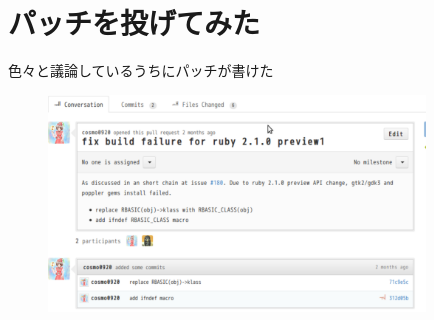 \section{パッチを投げてみた}

\begin{frame}
\begin{center}
{\Huge
色々と議論しているうちにパッチが書けた
}
\end{center}
\end{frame}

\begin{frame}
\begin{figure}
\begin{center}
  \includegraphics[width=10cm]{img/pull181.pdf}
\end{center}
\end{figure}
\end{frame}
